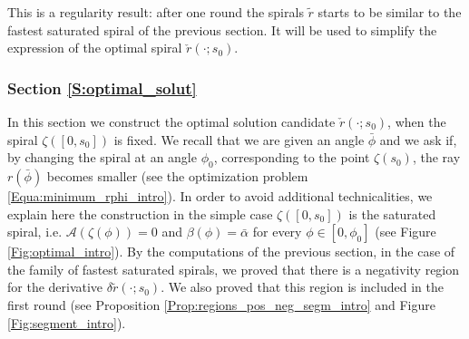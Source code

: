 \documentclass[reqno]{amsart}
\theoremstyle{definition} \newtheorem{definition}{Definition}[section]
\theoremstyle{definition} \newtheorem{remark}[definition]{Remark}
\theoremstyle{plain} \newtheorem{lemma}[definition]{Lemma}
\theoremstyle{plain} \newtheorem{proposition}[definition]{Proposition}
\theoremstyle{plain} \newtheorem{theorem}[definition]{Theorem}
\theoremstyle{plain} \newtheorem{corollary}[definition]{Corollary}
\theoremstyle{definition} \newtheorem{example}[definition]{Example}
\theoremstyle{plain} \newtheorem{claim}[clai]{Claim}
\theoremstyle{definition} \newtheorem{assumption}[definition]{Assumption}
\theoremstyle{definition} \newtheorem{observation}[definition]{Observation}
\newcommand{\1}{\mathbbm 1}
\numberwithin{equation}{section} %
\theoremstyle{plain} \newtheorem*{theorem*}{Theorem}
\theoremstyle{plain} \newtheorem{mthm}[maintheorem]{Main Theorem}
\theoremstyle{plain} \newtheorem*{mthm*}{Main Theorem}
\theoremstyle{plain} \newtheorem*{conjecture*}{Conjecture}
\theoremstyle{plain} \newtheorem{conjecture}[definition]{Conjecture}
\theoremstyle{plain} \newtheorem*{problem*}{Problem}
\begin{document}
This is a regularity result: after one round the spirals $\tilde r$ starts to be similar to the fastest saturated spiral of the previous section. It will be used to simplify the expression of the optimal spiral $\check r(\cdot;s_0)$.


\subsubsection{Section \ref{S:optimal_solut}}
\label{Sss:optimal_solut_intro}


In this section we construct the optimal solution candidate $\check r(\cdot;s_0)$, when the spiral $\zeta([0,s_0])$ is fixed. We recall that we are given an angle $\bar\phi$ and we ask if, by changing the spiral at an angle $\phi_0$, corresponding to the point $\zeta(s_0)$, the ray $r(\bar\phi)$ becomes smaller (see the optimization problem \eqref{Equa:minimum_rphi_intro}). In order to avoid additional technicalities, we explain here the construction in the simple case $\zeta([0,s_0])$ is the saturated spiral, i.e. $\mathcal{A}(\zeta(\phi))=0$ and $\beta(\phi)=\bar\alpha$ for every $\phi\in[0,\phi_0]$ (see Figure \ref{Fig:optimal_intro}). By the computations of the previous section, in the case of the family of fastest saturated spirals, we proved that there is a negativity region for the derivative $\delta\tilde r(\cdot;s_0)$. We also proved that this region is included in the first round (see Proposition \ref{Prop:regions_pos_neg_segm_intro} and Figure \ref{Fig:segment_intro}).
\end{document}
